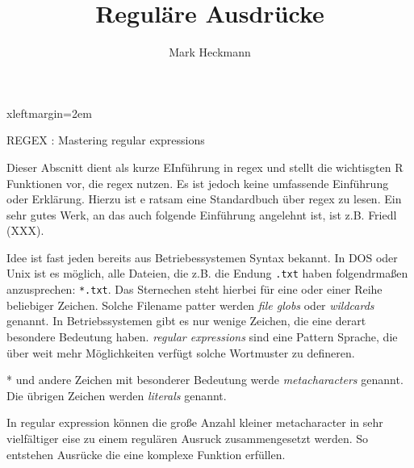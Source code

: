 \documentclass[a4paper]{report}
\title{Reguläre Ausdrücke}
\author{Mark Heckmann}
\newcommand{\R}{{\sffamily R}}
\begin{document}
  
 {xleftmargin=2em}    \renewenvironment{Schunk}{\vspace{\topsep}}{\vspace{\topsep}}


  
\maketitle


\tableofcontents

REGEX : Mastering regular expressions

Dieser Abscnitt dient als kurze EInführung in regex und stellt die wichtisgten  \R{} Funktionen vor, die regex nutzen. Es ist jedoch keine umfassende Einführung oder Erklärung. Hierzu ist e ratsam eine Standardbuch über regex zu lesen. Ein sehr gutes Werk, an das auch folgende Einführung angelehnt ist, ist z.B. Friedl (XXX).

Idee ist fast jeden bereits aus Betriebessystemen Syntax bekannt.
In DOS oder Unix ist es möglich, alle Dateien, die z.B. die Endung \texttt{.txt} haben folgendrmaßen anzusprechen: \texttt{*.txt}.
Das Sternechen steht hierbei für eine oder einer Reihe beliebiger Zeichen.
Solche Filename patter werden \emph{file globs} oder \emph{wildcards} genannt. In Betriebssystemen gibt es nur wenige Zeichen, die eine derart besondere Bedeutung haben. \emph{regular expressions} sind eine Pattern Sprache, die über weit mehr Möglichkeiten verfügt solche Wortmuster zu defineren.

* und andere Zeichen mit besonderer Bedeutung werde \emph{metacharacters} genannt. Die übrigen Zeichen werden \emph{literals} genannt. 

In regular expression können die große Anzahl kleiner metacharacter in sehr vielfältiger eise zu einem regulären Ausruck zusammengesetzt werden. So entstehen Ausrücke die eine komplexe Funktion erfüllen.
\end{document}
